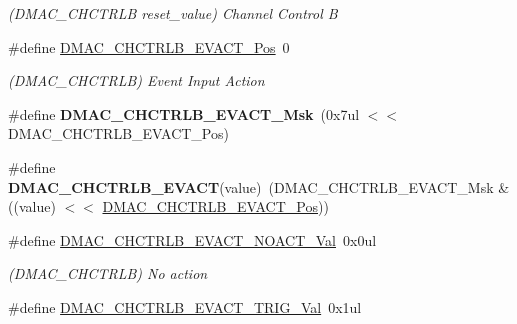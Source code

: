 \begin{DoxyCompactItemize}
\begin{DoxyCompactList}\small\item\em (D\+M\+A\+C\+\_\+\+C\+H\+C\+T\+R\+L\+B reset\+\_\+value) Channel Control B \end{DoxyCompactList}\item 
\hypertarget{group___s_a_m_l21___d_m_a_c_ga5d582eee4f8e2bfd97709b103da6830e}{}\#define \hyperlink{group___s_a_m_l21___d_m_a_c_ga5d582eee4f8e2bfd97709b103da6830e}{D\+M\+A\+C\+\_\+\+C\+H\+C\+T\+R\+L\+B\+\_\+\+E\+V\+A\+C\+T\+\_\+\+Pos}~0\label{group___s_a_m_l21___d_m_a_c_ga5d582eee4f8e2bfd97709b103da6830e}

\begin{DoxyCompactList}\small\item\em (D\+M\+A\+C\+\_\+\+C\+H\+C\+T\+R\+L\+B) Event Input Action \end{DoxyCompactList}\item 
\hypertarget{group___s_a_m_l21___d_m_a_c_gaf77b8385ed5e2dff5e120a2097e06ef0}{}\#define {\bfseries D\+M\+A\+C\+\_\+\+C\+H\+C\+T\+R\+L\+B\+\_\+\+E\+V\+A\+C\+T\+\_\+\+Msk}~(0x7ul $<$$<$ D\+M\+A\+C\+\_\+\+C\+H\+C\+T\+R\+L\+B\+\_\+\+E\+V\+A\+C\+T\+\_\+\+Pos)\label{group___s_a_m_l21___d_m_a_c_gaf77b8385ed5e2dff5e120a2097e06ef0}

\item 
\hypertarget{group___s_a_m_l21___d_m_a_c_ga729f0b50baa75b9d5a994739a89aa660}{}\#define {\bfseries D\+M\+A\+C\+\_\+\+C\+H\+C\+T\+R\+L\+B\+\_\+\+E\+V\+A\+C\+T}(value)~(D\+M\+A\+C\+\_\+\+C\+H\+C\+T\+R\+L\+B\+\_\+\+E\+V\+A\+C\+T\+\_\+\+Msk \& ((value) $<$$<$ \hyperlink{group___s_a_m_l21___d_m_a_c_ga5d582eee4f8e2bfd97709b103da6830e}{D\+M\+A\+C\+\_\+\+C\+H\+C\+T\+R\+L\+B\+\_\+\+E\+V\+A\+C\+T\+\_\+\+Pos}))\label{group___s_a_m_l21___d_m_a_c_ga729f0b50baa75b9d5a994739a89aa660}

\item 
\hypertarget{group___s_a_m_l21___d_m_a_c_ga0a82857cf374c8eb7754e671c886dcac}{}\#define \hyperlink{group___s_a_m_l21___d_m_a_c_ga0a82857cf374c8eb7754e671c886dcac}{D\+M\+A\+C\+\_\+\+C\+H\+C\+T\+R\+L\+B\+\_\+\+E\+V\+A\+C\+T\+\_\+\+N\+O\+A\+C\+T\+\_\+\+Val}~0x0ul\label{group___s_a_m_l21___d_m_a_c_ga0a82857cf374c8eb7754e671c886dcac}

\begin{DoxyCompactList}\small\item\em (D\+M\+A\+C\+\_\+\+C\+H\+C\+T\+R\+L\+B) No action \end{DoxyCompactList}\item 
\hypertarget{group___s_a_m_l21___d_m_a_c_ga069ed2b2546fdd8706fe1eedcb1674d2}{}\#define \hyperlink{group___s_a_m_l21___d_m_a_c_ga069ed2b2546fdd8706fe1eedcb1674d2}{D\+M\+A\+C\+\_\+\+C\+H\+C\+T\+R\+L\+B\+\_\+\+E\+V\+A\+C\+T\+\_\+\+T\+R\+I\+G\+\_\+\+Val}~0x1ul\label{group___s_a_m_l21___d_m_a_c_ga069ed2b2546fdd8706fe1eedcb1674d2}


\end{DoxyCompactItemize}
